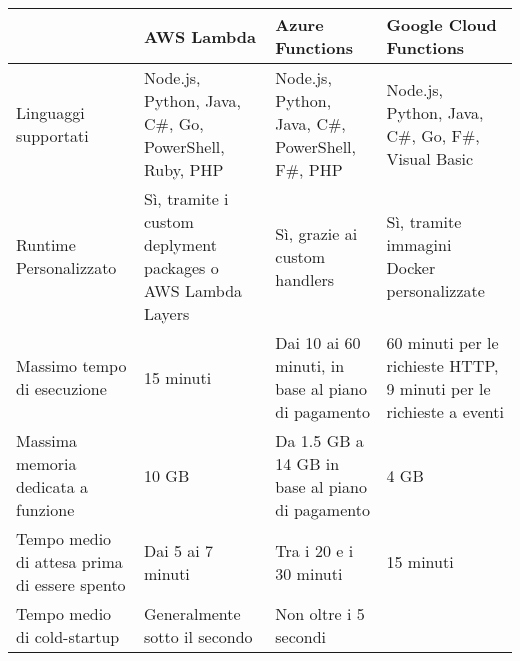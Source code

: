 \begin{longtable} {|P{3.5cm}|P{3.7cm}|P{3.7cm}|P{3.7cm}|}
    \hline
                                                    & \textbf{AWS Lambda}                                         & \textbf{Azure Functions} & \textbf{Google Cloud Functions} \\
    \hline
    \endhead
    Linguaggi supportati                            &
    Node.js, Python, Java, C\#, Go, PowerShell, Ruby, PHP
                                                    &
    Node.js, Python, Java, C\#, PowerShell, F\#, PHP
                                                    &
    Node.js, Python, Java, C\#, Go, F\#, Visual Basic                                                                                                                          \\
    \hline
    Runtime Personalizzato                          & Sì, tramite i custom deplyment packages o AWS Lambda Layers &
    Sì, grazie ai custom handlers                   &
    Sì, tramite immagini Docker personalizzate                                                                                                                                 \\
    \hline
    Massimo tempo di esecuzione                     &
    15 minuti                                       &
    Dai 10 ai 60 minuti, in base al piano di pagamento
                                                    &
    60 minuti per le richieste HTTP, 9 minuti per le richieste a eventi                                                                                                        \\
    \hline
    Massima memoria dedicata a funzione             &
    10 GB                                           &
    Da 1.5 GB a 14 GB in base al piano di pagamento &
    4 GB                                                                                                                                                                       \\
    \hline
    Tempo medio di attesa prima di essere spento    &
    Dai 5 ai 7 minuti                               &
    Tra i 20 e i 30 minuti                          &
    15 minuti                                                                                                                                                                  \\
    \hline
    Tempo medio di cold-startup                     &
    Generalmente sotto il secondo                   &
    Non oltre i 5 secondi                           &

\end{longtable}
